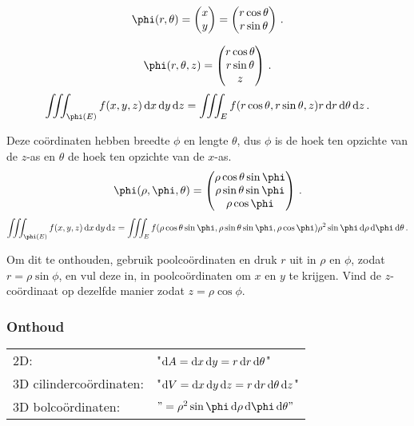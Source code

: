 \documentclass{2wa40summary}
\begin{document}
		\begin{voorbeeld}
			\[ 
				\phi (r,\theta) = \vvec{x \\ y} = \vvec {r \cos \theta \\ r \sin \theta} \,.
			 \]
		\end{voorbeeld}
		\begin{voorbeeld}
			\[ 
				\phi(r,\theta,z) = \vvec{r \cos \theta \\ r \sin \theta \\ z} \,.
			 \]
			 \[ 
				 \iiint_{\phi(E)} f(x,y,z) \d x \d y \d z = \iiint_E f (r \cos \theta, r \sin \theta , z) r \d r \d \theta \d z \,.
			  \]
		\end{voorbeeld}
		\begin{voorbeeld}
			Deze co\"ordinaten hebben breedte $\phi$ en lengte $\theta$, dus $\phi$ is de hoek ten opzichte van de $z$-as en $\theta$ de hoek ten opzichte van de $x$-as.
			\[ 
				\phi(\rho,\phi,\theta) = \vvec{\rho \cos \theta \sin \phi \\ \rho \sin \theta \sin \phi \\ \rho \cos \phi} \,.
			 \]
			 \[ 
				 \iiint_{\phi(E)} f(x,y,z) \d x \d y \d z = \iiint_E f(\rho \cos \theta \sin \phi , \rho \sin \theta \sin \phi , \rho \cos \phi) \rho^2 \sin \phi \d \rho \d \phi \d \theta \,.
			  \]

			Om dit te onthouden, gebruik poolco\"ordinaten en druk $r$ uit in $\rho$ en $\phi$, zodat $r=\rho \sin \phi$, en vul deze in, in poolco\"ordinaten om $x$ en $y$ te krijgen. Vind de $z$-co\"ordinaat op dezelfde manier zodat $z=\rho \cos \phi$.
			
		\end{voorbeeld}
		\subsubsection{Onthoud}
		\begin{tabular}{ll}
			2D: & "$\mathop{}\!\mathrm{d} A = \mathop{}\!\mathrm{d} x \mathop{}\!\mathrm{d} y = r \mathop{}\!\mathrm{d} r \mathop{}\!\mathrm{d} \theta$" \\
			3D cilinderco\"ordinaten: & "$\mathop{}\!\mathrm{d} V = \mathop{}\!\mathrm{d} x \mathop{}\!\mathrm{d} y \mathop{}\!\mathrm{d} z = r \mathop{}\!\mathrm{d} r \mathop{}\!\mathrm{d} \theta \mathop{}\!\mathrm{d} z $" \\
			3D bolco\"ordinaten: & $"=\rho^2 \sin \phi \d \rho \d \phi \d \theta"$
		\end{tabular}
		
\end{document}
